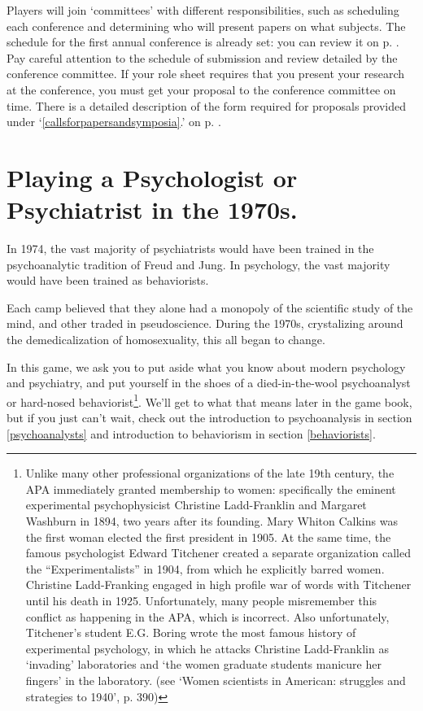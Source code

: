 \begin{refsection}
Players will join `committees' with different responsibilities, such as scheduling each conference and determining who will present papers on what subjects. The schedule for the first annual conference is already set: you can review it on p. \pageref{conferenceschedulefor1971} . Pay careful attention to the schedule of submission and review detailed by the conference committee. If your role sheet requires that you present your research at the conference, you must get your proposal to the conference committee on time. There is a detailed description of the form required for proposals provided under `\ref{callsforpapersandsymposia}.' on p. \pageref{callsforpapersandsymposia}.

\section{Playing a Psychologist or Psychiatrist in the 1970s.}
\label{playingapsychologistorpsychiatristinthe1970s.}

In 1974, the vast majority of psychiatrists would have been trained in the psychoanalytic tradition of Freud and Jung. In psychology, the vast majority would have been trained as behaviorists.

Each camp believed that they alone had a monopoly of the scientific study of the mind, and other traded in pseudoscience. During the 1970s, crystalizing around the demedicalization of homosexuality, this all began to change. 

In this game, we ask you to put aside what you know about modern psychology and psychiatry, and put yourself in the shoes of a died-in-the-wool psychoanalyst or hard-nosed behaviorist\footnote{Unlike many other professional organizations of the late 19th century, the APA immediately granted membership to women: specifically the eminent experimental psychophysicist Christine Ladd-Franklin and Margaret Washburn in 1894, two years after its founding. Mary Whiton Calkins was the first woman elected the first president in 1905.⁠
At the same time, the famous psychologist Edward Titchener created a separate organization called the ``Experimentalists'' in 1904, from which he explicitly barred women. Christine Ladd-Franking engaged in high profile war of words with Titchener until his death in 1925. Unfortunately, many people misremember this conflict as happening in the APA, which is incorrect. Also unfortunately, Titchener's student E.G. Boring wrote the most famous history of experimental psychology, in which he attacks Christine Ladd-Franklin as `invading' laboratories and `the women graduate students manicure her fingers' in the laboratory. (see `Women scientists in American: struggles and strategies to 1940', p. 390)}. We'll get to what that means later in the game book, but if you just can't wait, check out the introduction to psychoanalysis in section \ref{psychoanalysts} and introduction to behaviorism in section \ref{behaviorists}.


\end{refsection}
